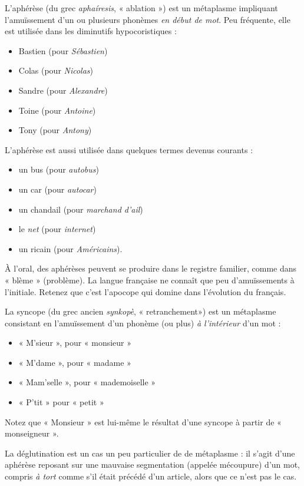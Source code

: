 L’aphérèse (du grec \textit{aphaíresis}, « ablation ») est un métaplasme impliquant l’amuïssement d’un ou plusieurs phonèmes \textit{en début de mot}. Peu fréquente, elle est utilisée dans les diminutifs hypocoristiques :
\begin{itemize}
\item Bastien (pour \textit{Sébastien})
\item Colas (pour \textit{Nicolas})
\item Sandre (pour \textit{Alexandre})
\item Toine (pour \textit{Antoine})
\item Tony (pour \textit{Antony})
\end{itemize}
L’aphérèse est aussi utilisée dans quelques termes devenus courants :
\begin{itemize}
\item un bus (pour \textit{autobus})
\item un car (pour \textit{autocar})
\item un chandail (pour \textit{marchand d’ail})
\item le \textit{net} (pour \textit{internet})
\item un ricain (pour \textit{Américains}).
\end{itemize}
À l’oral, des aphérèses peuvent se produire dans le registre familier, comme dans « blème » (problème). La langue française ne connaît que peu d’amuïssements à l’initiale. Retenez que c’est l’apocope qui domine dans l’évolution du français.

La syncope (du grec ancien \textit{synkopè}, « retranchement») est un métaplasme consistant en l’amuïssement d’un phonème (ou plus) \textit{à l’intérieur} d’un mot :
\begin{itemize}
\item « M’sieur », pour « monsieur »
\item « M’dame », pour « madame »
\item « Mam’selle », pour « mademoiselle »
\item « P’tit » pour « petit »
\end{itemize}
Notez que « Monsieur » est lui-même le résultat d’une syncope à partir de « monseigneur ».

La déglutination est un cas un peu particulier de de métaplasme : il s’agit d’une aphérèse reposant sur une mauvaise segmentation (appelée mécoupure) d’un mot, compris \textit{à tort} comme s’il était précédé d’un article, alors que ce n’est pas le cas.

